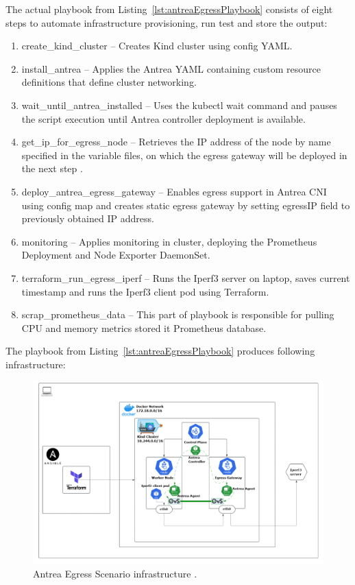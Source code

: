 The actual playbook from Listing~\ref{lst:antreaEgressPlaybook} consists of eight steps to automate infrastructure provisioning, run test and store the output:
\begin{enumerate}
  \item create\_kind\_cluster -- Creates Kind cluster using config YAML.
  \item install\_antrea -- Applies the Antrea YAML containing custom resource definitions that define cluster networking.
  \item wait\_until\_antrea\_installed -- Uses the kubectl wait command and pauses the script execution until Antrea controller deployment is available.
  \item get\_ip\_for\_egress\_node -- Retrieves the IP address of the node by name specified in the variable files, on which the egress gateway will be deployed in the next step .
  \item deploy\_antrea\_egress\_gateway -- Enables egress support in Antrea CNI using config map and creates static egress gateway by setting egressIP field to previously obtained IP address.
  \item monitoring -- Applies monitoring in cluster, deploying the Prometheus Deployment and Node Exporter DaemonSet.
  \item terraform\_run\_egress\_iperf -- Runs the Iperf3 server on laptop, saves current timestamp and runs the Iperf3 client pod using Terraform.
  \item scrap\_prometheus\_data -- This part of playbook is responsible for pulling CPU and memory metrics stored it Prometheus database.
\end{enumerate}

The playbook from Listing~\ref{lst:antreaEgressPlaybook} produces following infrastructure:

\begin{figure}[tbh]
  \centering
  \includegraphics[width=1\columnwidth]{images/antrea_egress_gateway_cluster.png}
  \caption{Antrea Egress Scenario infrastructure \cite{AntreaDocs}\cite{NGINX}.}
  \label{fig:antreaEgressScenarioArch}
\end{figure}

